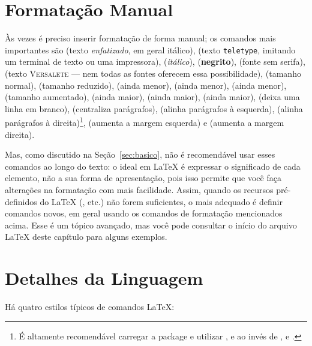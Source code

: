 \section{Formatação Manual}

Às vezes é preciso inserir formatação de forma manual; os comandos mais
importantes são
 (texto \emph{enfatizado}, em geral itálico),
 (texto \texttt{teletype}, imitando um
terminal de texto ou uma impressora),
 (\textit{itálico}),
 (\textbf{negrito}),
 (fonte \textsf{sem serifa}),
 (texto \textsc{Versalete} --- nem todas
as fontes oferecem essa possibilidade),
 (tamanho normal),
 (tamanho reduzido),
 (ainda menor),
 (ainda menor),
 (ainda menor),
 (tamanho aumentado),
 (ainda maior),
 (ainda maior),
 (ainda maior),
 (deixa uma linha em branco),
 (centraliza parágrafos),
 (alinha parágrafos à esquerda),
 (alinha parágrafos à direita)\footnote{É altamente
recomendável carregar a package  e utilizar ,
 e  ao invés de ,
 e .},
 (aumenta a margem esquerda) e
 (aumenta a margem direita).

Mas, como discutido na Seção~\ref{sec:basico}, não é recomendável
usar esses comandos ao longo do texto: o ideal em \LaTeX{} é expressar
o significado de cada elemento, não a sua forma de apresentação,
pois isso permite que você faça alterações na formatação com mais
facilidade. Assim, quando os recursos pré-definidos do \LaTeX{}
(,  etc.) não forem suficientes,
o mais adequado é definir comandos novos, em geral usando os comandos
de formatação mencionados acima. Esse é um tópico avançado, mas você
pode consultar o início do arquivo \LaTeX{} deste capítulo para alguns
exemplos.

\section{Detalhes da Linguagem}

Há quatro estilos típicos de comandos \LaTeX{}:

